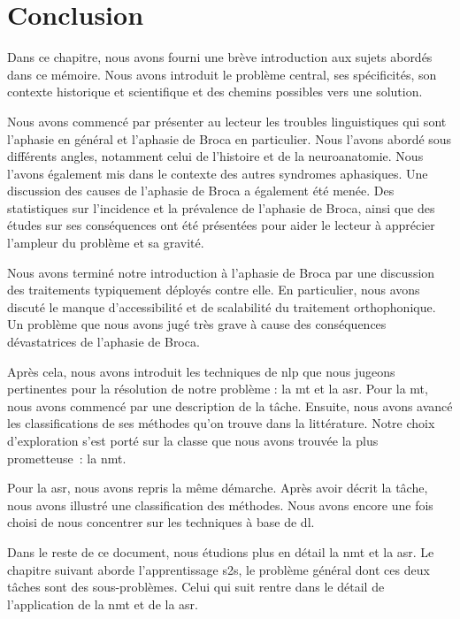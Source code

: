 \section{Conclusion}

Dans ce chapitre, nous avons fourni une brève introduction aux sujets abordés dans ce mémoire.
Nous avons introduit le problème central, ses spécificités, son contexte historique et scientifique 
et des chemins possibles vers une solution.

Nous avons commencé par présenter au lecteur les troubles linguistiques qui sont 
l'aphasie en général et l'aphasie de Broca en particulier.
Nous l'avons abordé sous différents angles, notamment celui de l'histoire et de la neuroanatomie.
Nous l'avons également mis dans le contexte des autres syndromes aphasiques.
Une discussion des causes de l'aphasie de Broca a également été menée.
Des statistiques sur l'incidence et la prévalence de l'aphasie de Broca,
ainsi que des études sur ses conséquences ont été présentées
pour aider le lecteur à apprécier l'ampleur du problème et sa gravité.

Nous avons terminé notre introduction à l'aphasie de Broca 
par une discussion des traitements typiquement déployés contre elle.
En particulier, nous avons discuté le manque d'accessibilité et de scalabilité du traitement orthophonique.
Un problème que nous avons jugé très grave à cause des conséquences dévastatrices de l'aphasie de Broca.

Après cela, nous avons introduit les techniques de \gls{nlp} que nous jugeons pertinentes
pour la résolution de notre problème : la \gls{mt} et la \gls{asr}.
Pour la \gls{mt}, nous avons commencé par une description de la tâche.
Ensuite, nous avons avancé les classifications de ses méthodes qu'on trouve dans la littérature.
Notre choix d'exploration s'est porté sur la classe que nous avons trouvée la plus prometteuse~:
la \gls{nmt}.

Pour la \gls{asr}, nous avons repris la même démarche.
Après avoir décrit la tâche, nous avons illustré une classification des méthodes.
Nous avons encore une fois choisi de nous concentrer sur les techniques à base de \gls{dl}.

Dans le reste de ce document, nous étudions plus en détail la \gls{nmt} et la \gls{asr}.
Le chapitre suivant aborde l'apprentissage \gls{s2s}, 
le problème général dont ces deux tâches sont des sous-problèmes.
Celui qui suit rentre dans le détail de l'application de la \gls{nmt} et de la \gls{asr}.
